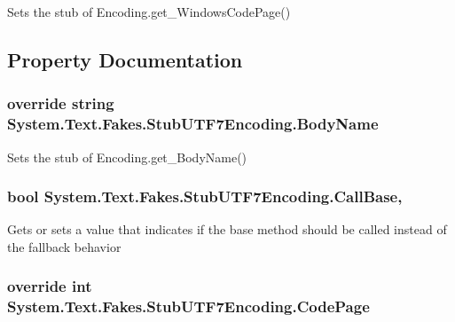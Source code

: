 Sets the stub of Encoding.\-get\-\_\-\-Windows\-Code\-Page()



\subsection{Property Documentation}
\hypertarget{class_system_1_1_text_1_1_fakes_1_1_stub_u_t_f7_encoding_a039ce87bad98777b95b69a025050c40b}{
\subsubsection[{Body\-Name}]{\setlength{\rightskip}{0pt plus 5cm}override string System.\-Text.\-Fakes.\-Stub\-U\-T\-F7\-Encoding.\-Body\-Name\hspace{0.3cm}{\ttfamily [get]}}}\label{class_system_1_1_text_1_1_fakes_1_1_stub_u_t_f7_encoding_a039ce87bad98777b95b69a025050c40b}


Sets the stub of Encoding.\-get\-\_\-\-Body\-Name()

\hypertarget{class_system_1_1_text_1_1_fakes_1_1_stub_u_t_f7_encoding_a6e6101f976da0bbdcbc27ee4546d27ac}{
\subsubsection[{Call\-Base}]{\setlength{\rightskip}{0pt plus 5cm}bool System.\-Text.\-Fakes.\-Stub\-U\-T\-F7\-Encoding.\-Call\-Base\hspace{0.3cm}{\ttfamily [get]}, {\ttfamily [set]}}}\label{class_system_1_1_text_1_1_fakes_1_1_stub_u_t_f7_encoding_a6e6101f976da0bbdcbc27ee4546d27ac}


Gets or sets a value that indicates if the base method should be called instead of the fallback behavior

\hypertarget{class_system_1_1_text_1_1_fakes_1_1_stub_u_t_f7_encoding_a086313478b96d43fa29277573dc1e8a1}{
\subsubsection[{Code\-Page}]{\setlength{\rightskip}{0pt plus 5cm}override int System.\-Text.\-Fakes.\-Stub\-U\-T\-F7\-Encoding.\-Code\-Page\hspace{0.3cm}{\ttfamily [get]}}}\label{class_system_1_1_text_1_1_fakes_1_1_stub_u_t_f7_encoding_a086313478b96d43fa29277573dc1e8a1}


